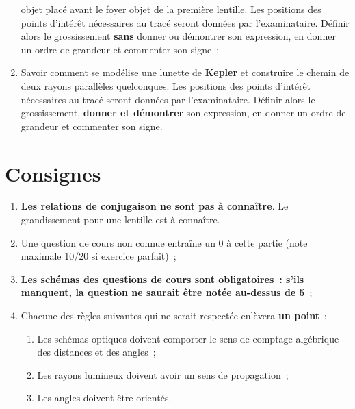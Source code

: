 \documentclass[a4paper, 12pt, final, garamond]{book}
\begin{document}
\begin{enumerate}
        objet placé avant le foyer objet de la première lentille. Les positions
        des points d'intérêt nécessaires au tracé seront données par
        l'examinataire. Définir alors le grossissement \textbf{sans} donner ou
        démontrer son expression, en donner un ordre de grandeur et commenter
        son signe~;
    \item Savoir comment se modélise une lunette de \textbf{Kepler} et
        construire le chemin de deux rayons parallèles quelconques. Les
        positions des points d'intérêt nécessaires au tracé seront données par
        l'examinataire. Définir alors le grossissement, \textbf{donner et
        démontrer} son expression, en donner un ordre de grandeur et commenter
        son signe.
\end{enumerate}

\section{Consignes}
\begin{enumerate}
    \item \textbf{Les relations de conjugaison ne sont pas à connaître}. Le
        grandissement pour une lentille est à connaître.
    \item Une question de cours non connue entraîne un 0 à cette partie (note
        maximale 10/20 si exercice parfait)~;
    \item \textbf{Les schémas des questions de cours sont obligatoires~: s'ils
        manquent, la question ne saurait être notée au-dessus de 5}~;
    \item Chacune des règles suivantes qui ne serait respectée enlèvera
        \textbf{un point}~:
        \begin{enumerate}
            \item Les schémas optiques doivent comporter le sens de comptage
                algébrique des distances et des angles~;
            \item Les rayons lumineux doivent avoir un sens de propagation~;
            \item Les angles doivent être orientés.
        \end{enumerate}
\end{enumerate}
\end{document}
